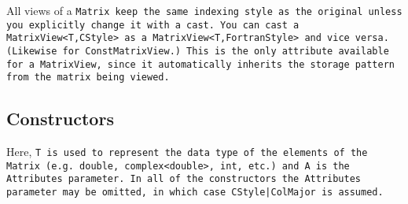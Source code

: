 All views of a \tt{Matrix} keep the same indexing style as the original unless you
explicitly change it with a cast.  You can cast a \tt{MatrixView<T,CStyle>}
as a \tt{MatrixView<T,FortranStyle>} and vice versa.  (Likewise for 
\tt{ConstMatrixView}.)  This is the only attribute available for a 
\tt{MatrixView}, since it automatically inherits the storage pattern from
the matrix being viewed.

\subsection{Constructors}
\label{Matrix_Constructors}

Here, \tt{T} is used to represent the data type of the elements of the \tt{Matrix}
(e.g. \tt{double}, \tt{complex<double>}, \tt{int}, etc.) and \tt{A} is the
Attributes parameter.
In all of the constructors the
Attributes parameter may be omitted, in which case \tt{CStyle|ColMajor} is assumed.

